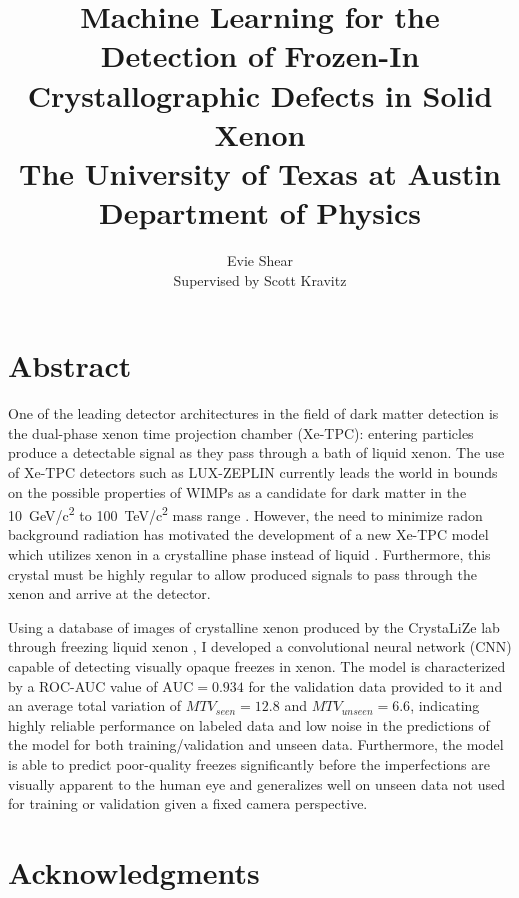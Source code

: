 \documentclass{article}
\begin{document}
\title{Machine Learning for the Detection of Frozen-In Crystallographic Defects in Solid Xenon \\[2.5ex] \large The University of Texas at Austin \\ Department of Physics}
\author{Evie Shear \\ Supervised by Scott Kravitz}
\maketitle
\pagebreak

\section*{Abstract}

One of the leading detector architectures in the field of dark matter detection is the dual-phase xenon time projection chamber (Xe-TPC): entering particles produce a detectable signal as they pass through a bath of liquid xenon. The use of Xe-TPC detectors such as LUX-ZEPLIN currently leads the world in bounds on the possible properties of WIMPs as a candidate for dark matter in the \qty{10}{\GeV/c^2} to \qty{100}{\TeV/c^2} mass range \cite{Aalbers2025}. However, the need to minimize radon background radiation has motivated the development of a new Xe-TPC model which utilizes xenon in a crystalline phase instead of liquid \cite{Kravitz2022}. Furthermore, this crystal must be highly regular to allow produced signals to pass through the xenon and arrive at the detector.

Using a database of images of crystalline xenon produced by the CrystaLiZe lab through freezing liquid xenon \cite{KravitzLabCrystaLiZe}, I developed a convolutional neural network (CNN) capable of detecting visually opaque freezes in xenon. The model is characterized by a ROC-AUC value of $\mathrm{AUC}=0.934$ for the validation data provided to it and an average total variation of $MTV_{seen}=12.8$ and $MTV_{unseen}=6.6$, indicating highly reliable performance on labeled data and low noise in the predictions of the model for both training/validation and unseen data. Furthermore, the model is able to predict poor-quality freezes significantly before the imperfections are visually apparent to the human eye and generalizes well on unseen data not used for training or validation given a fixed camera perspective.

\section*{Acknowledgments}
\end{document}
